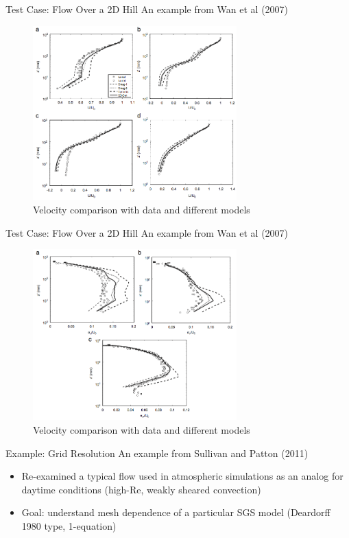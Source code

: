 \begin{frame}{Test Case: Flow Over a 2D Hill}
An example from Wan et al (2007) 
\begin{figure}
\includegraphics[width=0.7\textwidth]{compare16}
~\\ Velocity comparison with data and different models
\end{figure}
\end{frame}
\begin{frame}{Test Case: Flow Over a 2D Hill}
An example from Wan et al (2007) 
\begin{figure}
\includegraphics[width=0.7\textwidth]{compare17}
~\\ Velocity comparison with data and different models
\end{figure}
\end{frame}
\begin{frame}{Example: Grid Resolution}
An example from Sullivan and Patton (2011) 
\begin{itemize}
	\item  Re-examined a typical flow used in atmospheric simulations as an analog for daytime conditions (high-Re, weakly sheared convection)
	\item Goal: understand mesh dependence of a particular SGS model (Deardorff 1980 type, 1-equation) 
\end{itemize}
\end{frame}

